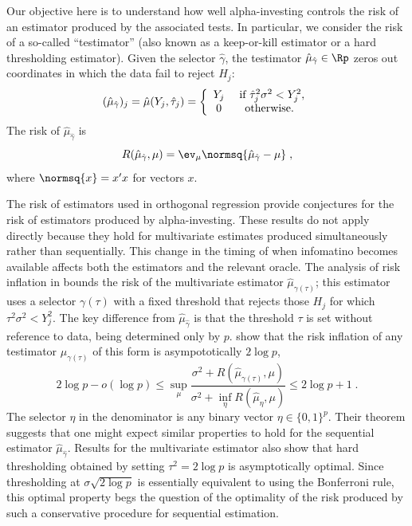 \documentclass[12pt]{article}
\begin{document}
 
 Our objective here is to understand how well alpha-investing controls the risk
 of an estimator produced by the associated tests.  In particular, we consider
 the risk of a so-called ``testimator'' (also known as a keep-or-kill estimator
 or a hard thresholding estimator).  Given the selector $\hat\gamma$, the
 testimator $\hat\mu_{\hat\gamma} \in \Rp$ zeros out coordinates in which the
 data fail to reject $H_j$:
 \begin{equation}
   (\hat\mu_{\hat\gamma})_j 
          = \hat\mu(Y_j, \hat\tau_j) 
          = \left\{ \begin{array}{cc}
                                Y_j & \mbox{ if } \hat\tau_j^2 \sigma^2 < Y_j^2,  \cr
                                 0  & \mbox{ otherwise. }
                              \end{array}\right.
 \label{eq:muhat}
 \end{equation}
 The risk of $\hat\mu_{\hat\gamma}$ is
 \begin{equation}
    R(\hat\mu_{\hat\gamma}, \mu) 
      = \ev_\mu \normsq{\hat\mu_{\hat\gamma} - \mu} \;,
 \label{eq:risk}
 \end{equation}
 where $\normsq{x} = x'x$ for vectors $x$. 


 The risk of estimators used in orthogonal regression provide conjectures for
 the risk of estimators produced by alpha-investing.  These results do not apply
 directly because they hold for multivariate estimates produced simultaneously
 rather than sequentially.  This change in the timing of when infomatino becomes
 available affects both the estimators and the relevant oracle.  The analysis of
 risk inflation in \citet{fostergeorge94} bounds the risk of the multivariate
 estimator $\hat\mu_{\gamma(\tau)}$; this estimator uses a selector
 $\gamma(\tau)$ with a fixed threshold that rejects those $H_j$ for which
 $\tau^2 \sigma^2 < Y_j^2$.  The key difference from $\hat\mu_{\hat\gamma}$ is
 that the threshold $\tau$ is set without reference to data, being determined
 only by $p$.  \citet{fostergeorge94} show that the risk inflation of any
 testimator $\hat\mu_{\gamma(\tau)}$ of this form is asympototically $2 \log p$,
 \begin{equation}
    2 \log p - o(\log p) 
    \le
    \sup_\mu  \frac{\sigma^2 + R(\hat\mu_{\gamma(\tau)}, \mu)}
                   {\sigma^2 + \inf_\eta{R(\hat\mu_\eta, \mu)}}  
    \le 
    2 \log p + 1 \;.
 \label{eq:ri}
 \end{equation}
 The selector $\eta$ in the denominator is any binary vector $\eta \in
 \{0,1\}^p$.  Their theorem \citep[and the related results
 in][]{donohojohnstone94} suggests that one might expect similar properties to
 hold for the sequential estimator $\hat\mu_{\hat\gamma}$.  Results for the
 multivariate estimator also show that hard thresholding obtained by setting
 $\tau^2 = 2 \log p$ is asymptotically optimal.  Since thresholding at $\sigma
 \sqrt{2 \log p}$ is essentially equivalent to using the Bonferroni rule, this
 optimal property begs the question of the optimality of the risk produced by
 such a conservative procedure for sequential estimation.
\end{document}
